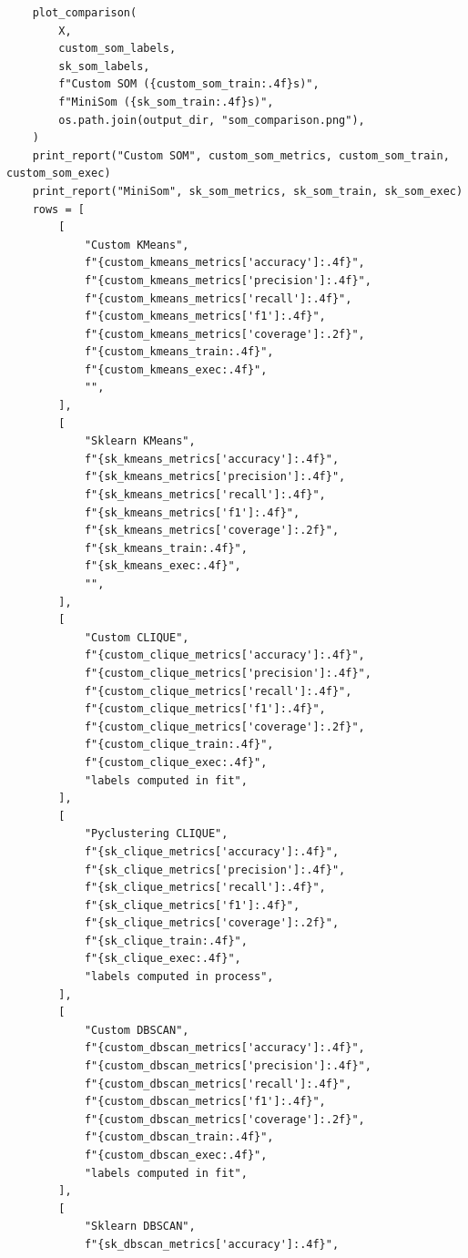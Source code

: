 \documentclass[runningheads]{ctexart}
\begin{document}
\begin{lstlisting}
    plot_comparison(
        X,
        custom_som_labels,
        sk_som_labels,
        f"Custom SOM ({custom_som_train:.4f}s)",
        f"MiniSom ({sk_som_train:.4f}s)",
        os.path.join(output_dir, "som_comparison.png"),
    )
    print_report("Custom SOM", custom_som_metrics, custom_som_train, custom_som_exec)
    print_report("MiniSom", sk_som_metrics, sk_som_train, sk_som_exec)
    rows = [
        [
            "Custom KMeans",
            f"{custom_kmeans_metrics['accuracy']:.4f}",
            f"{custom_kmeans_metrics['precision']:.4f}",
            f"{custom_kmeans_metrics['recall']:.4f}",
            f"{custom_kmeans_metrics['f1']:.4f}",
            f"{custom_kmeans_metrics['coverage']:.2f}",
            f"{custom_kmeans_train:.4f}",
            f"{custom_kmeans_exec:.4f}",
            "",
        ],
        [
            "Sklearn KMeans",
            f"{sk_kmeans_metrics['accuracy']:.4f}",
            f"{sk_kmeans_metrics['precision']:.4f}",
            f"{sk_kmeans_metrics['recall']:.4f}",
            f"{sk_kmeans_metrics['f1']:.4f}",
            f"{sk_kmeans_metrics['coverage']:.2f}",
            f"{sk_kmeans_train:.4f}",
            f"{sk_kmeans_exec:.4f}",
            "",
        ],
        [
            "Custom CLIQUE",
            f"{custom_clique_metrics['accuracy']:.4f}",
            f"{custom_clique_metrics['precision']:.4f}",
            f"{custom_clique_metrics['recall']:.4f}",
            f"{custom_clique_metrics['f1']:.4f}",
            f"{custom_clique_metrics['coverage']:.2f}",
            f"{custom_clique_train:.4f}",
            f"{custom_clique_exec:.4f}",
            "labels computed in fit",
        ],
        [
            "Pyclustering CLIQUE",
            f"{sk_clique_metrics['accuracy']:.4f}",
            f"{sk_clique_metrics['precision']:.4f}",
            f"{sk_clique_metrics['recall']:.4f}",
            f"{sk_clique_metrics['f1']:.4f}",
            f"{sk_clique_metrics['coverage']:.2f}",
            f"{sk_clique_train:.4f}",
            f"{sk_clique_exec:.4f}",
            "labels computed in process",
        ],
        [
            "Custom DBSCAN",
            f"{custom_dbscan_metrics['accuracy']:.4f}",
            f"{custom_dbscan_metrics['precision']:.4f}",
            f"{custom_dbscan_metrics['recall']:.4f}",
            f"{custom_dbscan_metrics['f1']:.4f}",
            f"{custom_dbscan_metrics['coverage']:.2f}",
            f"{custom_dbscan_train:.4f}",
            f"{custom_dbscan_exec:.4f}",
            "labels computed in fit",
        ],
        [
            "Sklearn DBSCAN",
            f"{sk_dbscan_metrics['accuracy']:.4f}",

\end{lstlisting}
\end{document}
